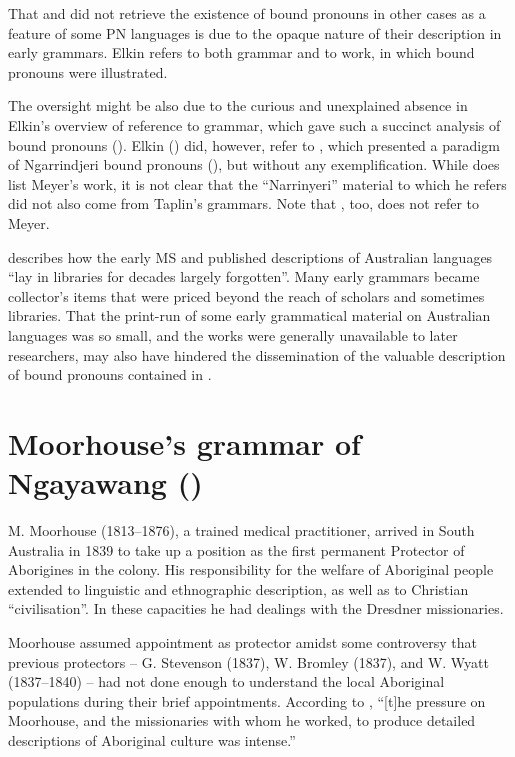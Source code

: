 That \citet{ray_aboriginal_1925} and \citet{elkin_nature_1937} did not retrieve the existence of bound pronouns in other cases as a feature of some PN languages is due to the opaque nature of their description in early grammars. Elkin refers to both  grammar and to  work, in which bound pronouns were illustrated.

The oversight might be also due to the curious and unexplained absence in Elkin’s overview of reference to  grammar, which gave such a succinct analysis of bound pronouns (). Elkin (\citeyear[133]{elkin_nature_1937}) did, however, refer to \citet{taplin_1879a_nodate}, which presented a paradigm of Ngarrindjeri bound pronouns (), but without any exemplification. While \citet[2]{ray_aboriginal_1925} does list Meyer’s work, it is not clear that the “Narrinyeri” material to which he refers did not also come from Taplin’s grammars. Note that \citet{capell_structure_1937}, too, does not refer to Meyer.

\citet{blake_nineteenth-century_2016} describes how the early MS and published descriptions of Australian languages “lay in libraries for decades largely forgotten”. Many early grammars became collector’s items that were priced beyond the reach of scholars and sometimes libraries. That the print-run of some early grammatical material on Australian languages was so small, and the works were generally unavailable to later researchers, may also have hindered the dissemination of the valuable description of bound pronouns contained in \citet{meyer_vocabulary_1843}.

\section{Moorhouse’s grammar of Ngayawang (\citeyear{moorhouse_vocabulary_1846})}
\label{sec:key:6.4}\label{bkm:Ref514605398}\label{bkm:Ref73379277}\label{bkm:Ref456104612}\label{bkm:Ref456103534}

M. Moorhouse (1813--1876), a trained medical practitioner, arrived in South Australia in 1839 to take up a position as the first permanent Protector of Aborigines in the colony. His responsibility for the welfare of Aboriginal people extended to linguistic and ethnographic description, as well as to Christian ``civilisation''. In these capacities he had dealings with the Dresdner missionaries.

Moorhouse assumed appointment as protector amidst some controversy that previous protectors -- G. Stevenson (1837), W. Bromley (1837), and W. Wyatt (1837--1840) -- had not done enough to understand the local Aboriginal populations during their brief appointments. According to \citet[5]{foster_two_1990}, “[t]he pressure on Moorhouse, and the missionaries with whom he worked, to produce detailed descriptions of Aboriginal culture was intense.”

